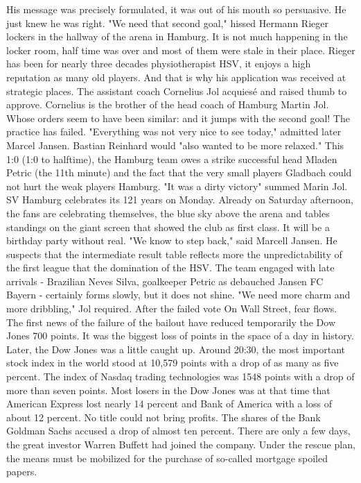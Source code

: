 His message was precisely formulated, it was out of his mouth so persuasive.
He just knew he was right.
"We need that second goal," hissed Hermann Rieger lockers in the hallway of the arena in Hamburg.
It is not much happening in the locker room, half time was over and most of them were stale in their place.
Rieger has been for nearly three decades physiotherapist HSV, it enjoys a high reputation as many old players.
And that is why his application was received at strategic places.
The assistant coach Cornelius Jol acquiesé and raised thumb to approve.
Cornelius is the brother of the head coach of Hamburg Martin Jol.
Whose orders seem to have been similar: and it jumps with the second goal!
The practice has failed.
"Everything was not very nice to see today," admitted later Marcel Jansen.
Bastian Reinhard would "also wanted to be more relaxed."
This 1:0 (1:0 to halftime), the Hamburg team owes a strike successful head Mladen Petric (the 11th minute) and the fact that the very small players Gladbach could not hurt the weak players Hamburg.
"It was a dirty victory" summed Marin Jol.
SV Hamburg celebrates its 121 years on Monday.
Already on Saturday afternoon, the fans are celebrating themselves, the blue sky above the arena and tables standings on the giant screen that showed the club as first class.
It will be a birthday party without real.
"We know to step back," said Marcell Jansen.
He suspects that the intermediate result table reflects more the unpredictability of the first league that the domination of the HSV.
The team engaged with late arrivals - Brazilian Neves Silva, goalkeeper Petric as debauched Jansen FC Bayern - certainly forms slowly, but it does not shine.
"We need more charm and more dribbling," Jol required.
After the failed vote
On Wall Street, fear flows.
The first news of the failure of the bailout have reduced temporarily the Dow Jones 700 points.
It was the biggest loss of points in the space of a day in history.
Later, the Dow Jones was a little caught up.
Around 20:30, the most important stock index in the world stood at 10,579 points with a drop of as many as five percent.
The index of Nasdaq trading technologies was 1548 points with a drop of more than seven points.
Most losers in the Dow Jones was at that time that American Express lost nearly 14 percent and Bank of America with a loss of about 12 percent.
No title could not bring profits.
The shares of the Bank Goldman Sachs accused a drop of almost ten percent.
There are only a few days, the great investor Warren Buffett had joined the company.
Under the rescue plan, the means must be mobilized for the purchase of so-called mortgage spoiled papers.
